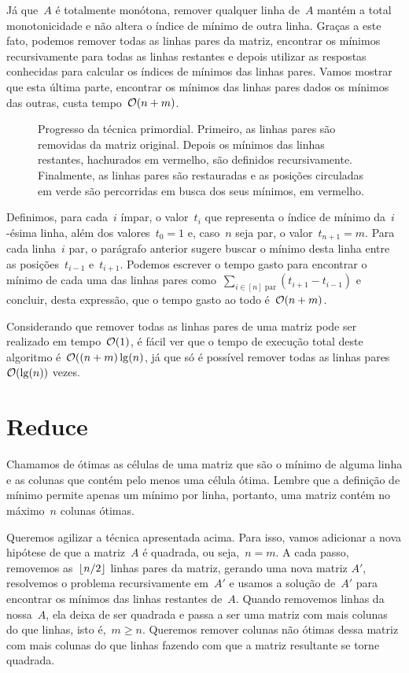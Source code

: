 Já que~$A$ é totalmente monótona, remover qualquer linha de~$A$ mantém a total monotonicidade e não altera o índice de mínimo de outra linha. Graças a este fato, podemos remover todas as linhas pares da matriz, encontrar os mínimos recursivamente para todas as linhas restantes e depois utilizar as respostas conhecidas para calcular os índices de mínimos das linhas pares. Vamos mostrar que esta última parte, encontrar os mínimos das linhas pares dados os mínimos das outras, custa tempo~$\mathcal{O}(n+m)$.

\begin{figure}[h]
    \centering
    
    \caption{Progresso da técnica primordial. Primeiro, as linhas pares são removidas da matriz original. Depois os mínimos das linhas restantes, hachurados em vermelho, são definidos recursivamente. Finalmente, as linhas pares são restauradas e as posições circuladas em verde são percorridas em busca dos seus mínimos, em vermelho.} 
\end{figure}

Definimos, para cada~$i$ ímpar, o valor~$t_i$ que representa o índice de mínimo da~$i$-ésima linha, além dos valores~${ t_0 = 1 }$ e, caso~$n$ seja par, o valor~${ t_{n+1} = m }$. Para cada linha~$i$ par, o parágrafo anterior sugere buscar o mínimo desta linha entre as posições~$t_{i-1}$ e~$t_{i+1}$. Podemos escrever o tempo gasto para encontrar o mínimo de cada uma das linhas pares como~${ \sum\limits_{ i \in [n] \text{ par} }( t_{i+1} - t_{i-1} ) }$ e concluir, desta expressão, que o tempo gasto ao todo é~$\mathcal{O}(n+m)$. 

Considerando que remover todas as linhas pares de uma matriz pode ser realizado em tempo~$\mathcal{O}(1)$, é fácil ver que o tempo de execução total deste algoritmo é~$\mathcal{O}((n+m)\lg(n)$, já que só é possível remover todas as linhas pares~$\mathcal{O}(\lg(n))$ vezes.


\section{Reduce} \label{SMAWK:reduce}
Chamamos de ótimas as células de uma matriz que são o mínimo de alguma linha e as colunas que contém pelo menos uma célula ótima. Lembre que a definição de mínimo permite apenas um mínimo por linha, portanto, uma matriz contém no máximo~$n$ colunas ótimas.

Queremos agilizar a técnica apresentada acima. Para isso, vamos adicionar a nova hipótese de que a matriz~$A$ é quadrada, ou seja,~$n = m$. A cada passo, removemos as~$\lfloor n/2\rfloor$ linhas pares da matriz, gerando uma nova matriz $A'$, resolvemos o problema recursivamente em~$A'$ e usamos a solução de~$A'$ para encontrar os mínimos das linhas restantes de~$A$. Quando removemos linhas da nossa~$A$, ela deixa de ser quadrada e passa a ser uma matriz com mais colunas do que linhas, isto é,~$m \geq n$. Queremos remover colunas não ótimas dessa matriz com mais colunas do que linhas fazendo com que a matriz resultante se torne quadrada.  

